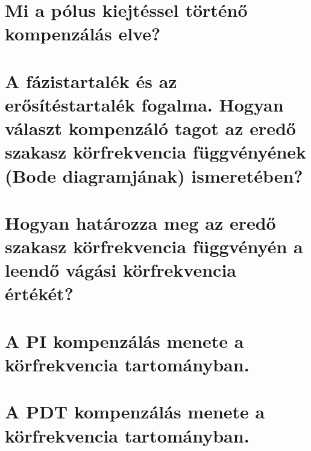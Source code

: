 \documentclass[11pt,a4paper]{article}
\begin{document}
\section{Mi a pólus kiejtéssel történő kompenzálás elve?}
\section{A fázistartalék és az erősítéstartalék fogalma. Hogyan választ kompenzáló tagot az eredő szakasz körfrekvencia függvényének (Bode diagramjának) ismeretében?}
\section{Hogyan határozza meg az eredő szakasz körfrekvencia függvényén a leendő vágási körfrekvencia értékét?}
\section{A PI kompenzálás menete a körfrekvencia tartományban. }
\section{A PDT kompenzálás menete a körfrekvencia tartományban. }

\tableofcontents
\end{document}
